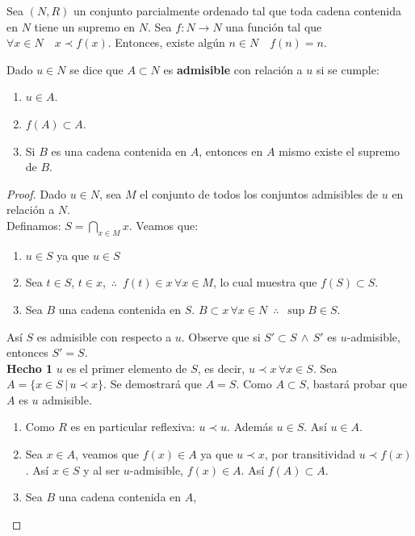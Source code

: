 \begin{proposition}
    Sea $(N,R)$ un conjunto parcialmente ordenado tal que toda cadena
    contenida en $N$ tiene un supremo en $N$. Sea $f:N\rightarrow N$ una
    función tal que $\forall x \in N \quad x \prec f(x)$. Entonces, existe
    algún $n \in N \quad f(n)=n$.
\end{proposition}
\begin{definition}
    Dado $u \in N$ se dice que $A \subset N$ es \textbf{admisible} con relación a $u$
    si se cumple: 
	\begin{enumerate}
        \item $u \in A$.
        \item $f(A) \subset A$.
        \item Si $B$ es una cadena contenida en $A$, entonces en $A$ mismo
            existe el supremo de $B$.
    \end{enumerate}
\end{definition}
\begin{proof}
    Dado $u \in N$, sea $M$ el conjunto de todos los conjuntos admisibles de
    $u$ en relación a $N$. \\
    Definamos: $S= \bigcap\limits_{x\in M} x$.  Veamos que:\\
    \begin{enumerate}
        \item $u \in S$ ya que $u \in S $
        \item Sea $t \in S$, $t \in  x$, $\,\therefore\,$ $f(t) \in x \,
            \forall x  \in M$, lo cual muestra que $f(S) \subset S$.
        \item Sea $B$ una cadena contenida en $S$. $B \subset x \, \forall x
            \in N$ $\, \therefore \,$ $\sup B \in S$.
    \end{enumerate}
    Así $S$ es admisible con respecto a $u$. Observe que si $S' \subset S \,
    \land \, S'$ es $u$-admisible, entonces $S' =S$. \\
    \textbf{Hecho 1} $u$ es el primer elemento de $S$, es decir, $u\prec x
    \, \forall x \in S$.
    Sea $A= \{ x \in S\, | \, u \prec x\}$. Se demostrará que $A =S$.
    Como $A \subset S$, bastará probar que $A$ es $u$ admisible.
    \\
    \begin{enumerate}
        \item Como $R$ es en particular reflexiva: $u \prec u$. Además $u
            \in S$. Así $u \in A$.
        \item Sea $x \in A$, veamos que $f(x) \in A$ ya que $u \prec x$, por
            transitividad $u \prec f(x)$. Así $x \in S$ y al ser
            $u$-admisible, $f(x) \in A$. Así $f(A) \subset A$.
        \item Sea $B$ una cadena contenida en $A$, 
    \end{enumerate}
\end{proof}


